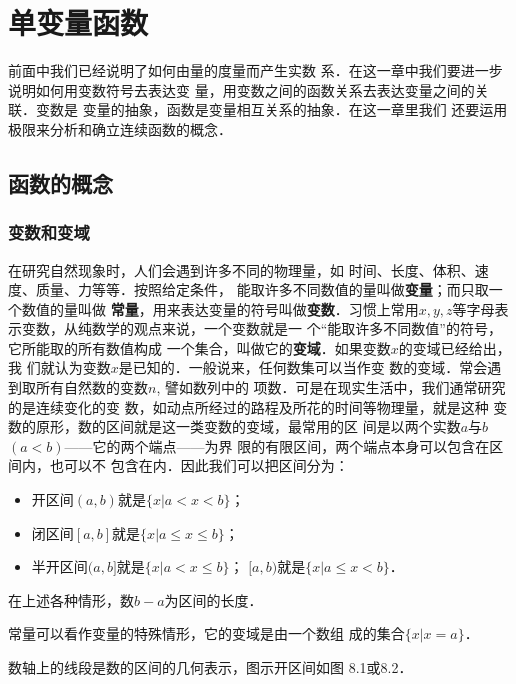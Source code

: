 \chapter{单变量函数}
前面中我们已经说明了如何由量的度量而产生实数
系．在这一章中我们要进一步说明如何用变数符号去表达变
量，用变数之间的函数关系去表达变量之间的关联．变数是
变量的抽象，函数是变量相互关系的抽象．在这一章里我们
还要运用极限来分析和确立连续函数的概念．

\section{函数的概念}
\subsection{变数和变域}
在研究自然现象时，人们会遇到许多不同的物理量，如
时间、长度、体积、速度、质量、力等等．按照给定条件，
能取许多不同数值的量叫做\textbf{变量}；而只取一个数值的量叫做
\textbf{常量}，用来表达变量的符号叫做\textbf{变数}．习惯上常用$x,y,
z$等字母表示变数，从纯数学的观点来说，一个变数就是一
个“能取许多不同数值”的符号，它所能取的所有数值构成
一个集合，叫做它的\textbf{变域}．如果变数$x$的变域已经给出，我
们就认为变数$x$是已知的．一般说来，任何数集可以当作变
数的变域．常会遇到取所有自然数的变数$n$, 譬如数列中的
项数．可是在现实生活中，我们通常研究的是连续变化的变
数，如动点所经过的路程及所花的时间等物理量，就是这种
变数的原形，数的区间就是这一类变数的变域，最常用的区
间是以两个实数$a$与$b$ $(a<b)$——它的两个端点——为界
限的有限区间，两个端点本身可以包含在区间内，也可以不
包含在内．因此我们可以把区间分为：
\begin{itemize}
    \item 开区间$(a,b)$就是$\{x|a<x<b\}$；
    \item  闭区间$[a,b]$就是$\{x|a\le x\le b\}$；
    \item  半开区间$(a,b]$就是$\{x|a<x\le b\}$；
    $[a,b)$就是$\{x|a\le x<b\}$．
\end{itemize}
在上述各种情形，数$b-a$为区间的长度．

常量可以看作变量的特殊情形，它的变域是由一个数组
成的集合$\{x|x=a\}$．

数轴上的线段是数的区间的几何表示，图示开区间如图
8.1或8.2．

